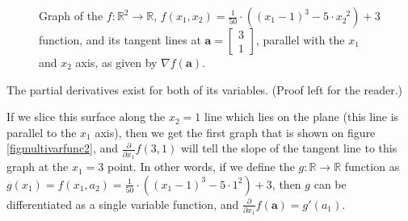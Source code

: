 \documentclass[titlepage]{article}
\begin{document}
            \begin{figure}[!htb]
              \centering
              \caption{%
                Graph of the $f : \mathbb{R}^2 \rightarrow \mathbb{R}$,
                $
                  f(x_1, x_2)
                    = \frac{1}{50}
                      \cdot
                      \left( (x_1 - 1)^3 - 5 \cdot x_2^{\enspace 2} \right) + 3
                $
                function, and its tangent lines at
                $\mathbf{a} = \begin{bmatrix} 3 \\ 1 \end{bmatrix}$,
                parallel with the $x_1$ and $x_2$ axis, as given by
                $\nabla f(\mathbf{a})$.
              } \label{figmultivarfunc1}
            \end{figure}

            The partial derivatives exist for both of its variables. (Proof
            left for the reader.)

            If we slice this surface along the $x_2 = 1$ line which lies on the
            plane (this line is parallel to the $x_1$ axis), then we get the
            first graph that is shown on figure \ref{figmultivarfunc2}, and
            $\frac{\partial}{\partial x_1} f(3, 1)$ will tell the slope of the
            tangent line to this graph at the $x_1 = 3$ point. In other words,
            if we define the $g : \mathbb{R} \rightarrow \mathbb{R}$ function as
            $
              g(x_1) = f(x_1, a_2)
                = \frac{1}{50} \cdot \left( (x_1 - 1)^3 - 5 \cdot 1^2 \right) + 3
            $, then $g$ can be differentiated as a single variable function, and
            $\frac{\partial}{\partial x_1} f(\mathbf{a}) = g'(a_1)$.
\end{document}

